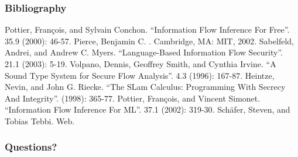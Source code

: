\documentclass{beamer}
\begin{document}
\begin{frame}[allowframebreaks]
  \frametitle{Bibliography}
  \begin{thebibliography}
    \beamertemplatearticlebibitems
      Pottier, Fran\c{c}ois, and Sylvain Conchon.
      \newblock ``Information Flow Inference For Free''.
       35.9 (2000): 46-57.
    \beamertemplatebookbibitems
      Pierce, Benjamin C.
      .
      \newblock Cambridge, MA: MIT, 2002.
    \beamertemplatearticlebibitems
      Sabelfeld, Andrei, and Andrew C. Myers.
      \newblock ``Language-Based Information Flow Security''.
                21.1 (2003): 5-19.
    \beamertemplatearticlebibitems
      Volpano, Dennis, Geoffrey Smith, and Cynthia Irvine.
      \newblock ``A Sound Type System for Secure Flow Analysis''.
       4.3 (1996): 167-87.
    \beamertemplatearticlebibitems
      Heintze, Nevin, and John G. Riecke.
      \newblock ``The SLam Calculus: Programming With Secrecy And Integrity''.
                (1998): 365-77.
    \beamertemplatearticlebibitems
      Pottier, Fran\c{c}ois, and Vincent Simonet.
      \newblock ``Information Flow Inference For ML''.
       37.1 (2002): 319-30.
    \beamertemplatearticlebibitems
      Sch\"{a}fer, Steven, and Tobias Tebbi.
      \newblock Web.
  \end{thebibliography}
\end{frame}
\begin{frame}
  \frametitle{Questions?}
\end{frame}
\end{document}
